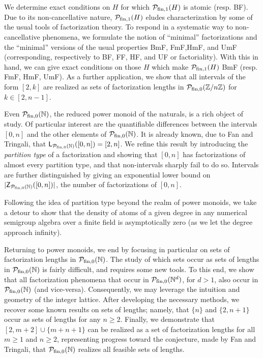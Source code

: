 We determine exact conditions on $H$ for which $\mathcal{P}_{\textrm{fin}, 1}(H)$ is atomic (resp. BF).
Due to its non-cancellative nature, $\mathcal{P}_{\textrm{fin}, 1}(H)$ eludes characterization by some of the usual tools of factorization theory.  
To respond in a systematic way to non-cancellative phenomena, we formulate the notion of ``minimal'' factorizations and the ``minimal'' versions of the usual properties BmF, FmF,HmF, and UmF (corresponding, respectively to BF, FF, HF, and UF or factoriality).
With this in hand, we can give exact conditions on those $H$ which make $\mathcal{P}_{\textrm{fin}, 1}(H)$ BmF (resp. FmF, HmF, UmF).
As a further application, we show that all intervals of the form $[2,k]$ are realized as sets of factorization lengths in $\mathcal{P}_{\textrm{fin}, 0}(\mathbb{Z}/n\mathbb{Z})$ for $k\in[2,n-1]$.

Even ${\mathcal{P}_{\textrm{fin},0}(\mathbb{N})}$, the reduced power monoid of the naturals, is a rich object of study.  
Of particular interest are the quantifiable differences between the intervals $[0,n]$ and the other elements of ${\mathcal{P}_{\textrm{fin},0}(\mathbb{N})}$.
It is already known, due to Fan and Tringali, that $\mathsf{L}_{\mathcal{P}_{\textrm{fin},0}(\mathbb{N})}([0,n]) = [2,n]$.
We refine this result by introducing the \textit{partition type} of a factorization and showing that $[0,n]$ has factorizations of almost every partition type, and that non-intervals sharply fail to do so.  
Intervals are further distinguished %
by giving an exponential lower bound on $|\mathsf{Z}_{\mathcal{P}_{\textrm{fin},0}(\mathbb{N})}([0,n])|$, the number of factorizations of $[0,n]$.

Following the idea of partition type beyond the realm of power monoids, we take a detour to show that the density of atoms of a given degree in any numerical semigroup algebra over a finite field is asymptotically zero (as we let the degree approach infinity).


Returning to power monoids, we end by focusing in particular on sets of factorization lengths in ${\mathcal{P}_{\textrm{fin},0}(\mathbb{N})}$.
The study of which sets occur as sets of lengths in ${\mathcal{P}_{\textrm{fin},0}(\mathbb{N})}$ is fairly difficult, and requires some new tools.
To this end, we show that all factorization phenomena that occur in $\mathcal{P}_{\textrm{fin}, 0}(\mathbb{N}^d)$, for $d>1$, also occur in ${\mathcal{P}_{\textrm{fin},0}(\mathbb{N})}$ (and vice-versa).
Consequently, we may leverage the intuition and geometry of the integer lattice.  
After developing the necessary methods, we recover some known results on sets of lengths; namely, that $\{n\}$ and $\{2,n+1\}$ occur as sets of lengths for any $n\ge 2$.
Finally, we demonstrate that $[2,m+2]\cup\{m+n+1\}$ can be realized as a set of factorization lengths for all $m\ge 1$ and $n\ge 2$, representing progress toward the conjecture, made by Fan and Tringali, that ${\mathcal{P}_{\textrm{fin},0}(\mathbb{N})}$ realizes all feasible sets of lengths.






